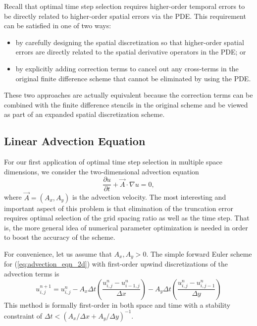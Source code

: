 \documentclass[fleqn,12pt,twoside]{article}
\newcommand{\beq}{\begin{equation}}
\newcommand{\eeq}{\end{equation}}
\def\dt{\Delta t}
\def\dx{\Delta x}
\def\dy{\Delta y}
\begin{document}
Recall that optimal time step selection requires higher-order temporal 
errors to be directly related to higher-order spatial errors via the PDE.  
This requirement can be satisfied in one of two ways:
\begin{itemize}
\item by carefully designing the spatial discretization so that 
      higher-order spatial errors are directly related to the spatial 
      derivative operators in the PDE; or
\item by explicitly adding correction terms to cancel out any cross-terms 
      in the original finite difference scheme that cannot be eliminated 
      by using the PDE.
\end{itemize}
These two approaches are actually equivalent because the correction terms 
can be combined with the finite difference stencils in the original scheme 
and be viewed as part of an expanded spatial discretization scheme. 


\subsection{Linear Advection Equation}
For our first application of optimal time step selection in multiple
space dimensions, we consider the two-dimensional advection
equation
\beq
  \frac{\partial u}{\partial t} + \vec{A} \cdot \nabla u = 0,
  \label{eq:advection_eqn_2d}
\eeq
where $\vec{A} = (A_x, A_y)$ is the advection velocity.  
The most interesting and important aspect of this problem is that elimination 
of the truncation error requires optimal selection of the grid spacing ratio 
as well as the time step.  That is, the more general idea of numerical 
parameter optimization is needed in order to boost the accuracy of the scheme.

For convenience, let us assume that $A_x, A_y > 0$.  The simple forward Euler 
scheme for (\ref{eq:advection_eqn_2d}) with first-order upwind discretizations 
of the advection terms is 
\beq
  u^{n+1}_{i,j} = u^{n}_{i,j}
  - A_x \dt \left( \frac{u^{n}_{i,j} - u^{n}_{i-1,j}}{\dx} \right)
  - A_y \dt \left( \frac{u^{n}_{i,j} - u^{n}_{i,j-1}}{\dy} \right)
  \label{eq:advection_eqn_2d_FD_scheme}
\eeq
This method is formally first-order in both space and time with a 
stability constraint of $\dt < \left( A_x/\dx + A_y/\dy \right)^{-1}$.
\end{document}

